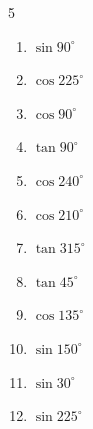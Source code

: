 \begin{multicols}{5}
\begin{enumerate}
        \phantom{$\displaystyle =-1$}

  \item $\displaystyle \sin{90^\circ}$

        \phantom{$\displaystyle =1$}

  \item $\displaystyle \cos{225^\circ}$


  \item $\displaystyle \cos{90^\circ}$

        \phantom{$\displaystyle =0$}

  \item $\displaystyle \tan{90^\circ}$

        \phantom{$\displaystyle なし$}

  \item $\displaystyle \cos{240^\circ}$


  \item $\displaystyle \cos{210^\circ}$


  \item $\displaystyle \tan{315^\circ}$

        \phantom{$\displaystyle =-1$}

  \item $\displaystyle \tan{45^\circ}$

        \phantom{$\displaystyle =1$}

  \item $\displaystyle \cos{135^\circ}$


  \item $\displaystyle \sin{150^\circ}$


  \item $\displaystyle \sin{30^\circ}$


  \item $\displaystyle \sin{225^\circ}$


\columnbreak %


\end{enumerate}
\end{multicols}
